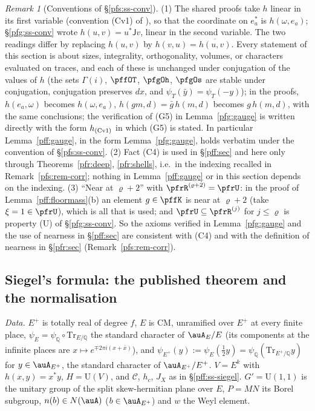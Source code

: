 \documentclass[10pt]{amsart}
\theoremstyle{definition}
\theoremstyle{remark}
\newtheorem{remark}[theorem]{Remark}
\newcommand{\Q}{\mathbb Q}
\providecommand{\auU}{\mathrm U}
\begin{document}
\begin{remark}[Conventions of \S\ref{pfs:ss-conv}]\label{pfg:rem-conv}
(1) The shared proofs take $h$ linear in its first variable (convention (Cv1) of {\cite[\S2.1]{P51}}), so that the coordinate on $e^*_a$ is $h(\omega,e_a)$;
\S\ref{pfg:ss-conv} wrote $h(u,v)=u^*\mathsf Jv$, linear in the second variable. The two readings differ by
replacing $h(u,v)$ by $h(v,u)=\overline{h(u,v)}$. Every statement of this section is about sizes, integrality,
orthogonality, volumes, or characters evaluated on traces, and each of these is unchanged under conjugation of the
values of $h$ (the sets $\Gamma(i)$, $\pffOT$, $\pfgOh$, $\pfgOs$ are stable under conjugation, conjugation preserves
$dx$, and $\psi_T(\bar y)=\psi_T(-y)$); in the proofs, $h(e_a,\omega)$ becomes $h(\omega,e_a)$, $h(gm,d)=\bar g\,h(m,d)$
becomes $g\,h(m,d)$, with the same conclusions; the verification of (G5) in Lemma~\ref{pfg:gauge} is written directly
with the form $h_{\rm (Cv1)}$ in which (G5) is stated. In particular
Lemma~\ref{pff:gauge}, in the form Lemma~\ref{pfg:gauge}, holds verbatim under the convention of \S\ref{pfs:ss-conv}.
(2) Fact (C4) is used in \S\ref{pff:sec} and here only through Theorems~\ref{pfr:deep}, \ref{pfr:shells}, i.e.\ in the
indexing recalled in Remark~\ref{pfs:rem-corr}; nothing in Lemma~\ref{pff:gauge} or in this
section depends on the indexing. (3) ``Near at $\varrho+2$'' with $\pfrR^{(\varrho+2)}=\pfrU$: in the proof of
Lemma~\ref{pff:floormass}(b) an element $g\in\pffK$ is near at $\varrho+2$ (take $\xi=1\in\pfrU$), which is all that is
used; and $\pfrU\subseteq\pfrR^{(j)}$ for $j\le\varrho$ is property (U) of \S\ref{pfg:ss-conv}. So the axioms verified in
Lemma~\ref{pfg:gauge} and the use of nearness in \S\ref{pff:sec} are consistent with (C4) and with the definition of nearness in \S\ref{pfr:sec} (Remark~\ref{pfs:rem-corr}).
\end{remark}

\subsection{Siegel's formula: the published theorem and the normalisation}\label{pfg:ss-siegel}

\emph{Data.} $E^+$ is totally real of degree $f$, $E$ is CM, unramified over $E^+$ at every finite place, $\psi_E=
\psi_\Q\circ\mathrm{Tr}_{E/\Q}$ the standard character of $\auA_E/E$ (its components at the infinite places are
$x\mapsto e^{\mp2\pi i(x+\bar x)}$), and $\psi_{E^+}(y):=\psi_E(\tfrac12y)=\psi_\Q(\mathrm{Tr}_{E^+/\Q}y)$ for
$y\in\auA_{E^+}$, the standard character of $\auA_{E^+}/E^+$. $V=E^k$ with $h(x,y)=x^*y$, $H=\auU(V)$, and $\mathcal C$,
$h_c$, $J_X$ as in \S\ref{pff:ss-siegel}. $G'=\auU(1,1)$ is the unitary group of the split skew-hermitian plane over $E$,
$P=MN$ its Borel subgroup, $n(b)\in N(\auA)$ ($b\in\auA_{E^+}$) and $w$ the Weyl element.
\end{document}
